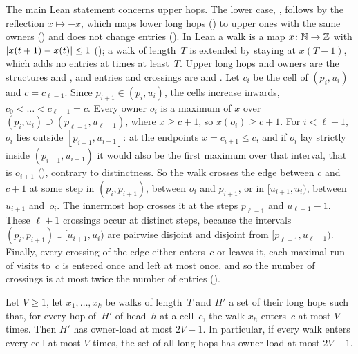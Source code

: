 \begin{outline}
The main Lean statement concerns upper hops. The lower case, , follows by the reflection
$x\mapsto-x$, which maps lower long hops () to upper ones with the same owners () and
does not change entries (). In Lean a walk is a map $x\colon\mathbb{N}\to\mathbb{Z}$ with
$\lvert x(t+1)-x(t) \rvert\le1$ (); a walk of length~$T$ is extended by staying at $x(T-1)$, which adds no entries
at times at least~$T$. Upper long hops and owners are the structures
 and , and entries and crossings are  and . Let $c_i$ be the
cell of $(p_i,u_i)$ and $c=c_{\ell-1}$. Since $p_{i+1}\in(p_i,u_i)$, the cells increase inwards, $c_0<\dots<c_{\ell-1}=c$.
Every owner $o_i$ is a maximum of $x$ over $(p_i,u_i)\supseteq(p_{\ell-1},u_{\ell-1})$, where $x\ge c+1$, so
$x(o_i)\ge c+1$. For $i<\ell-1$, $o_i$ lies outside $[p_{i+1},u_{i+1}]$: at the endpoints $x=c_{i+1}\le c$, and if $o_i$
lay strictly inside $(p_{i+1},u_{i+1})$ it would also be the first maximum over that interval, that is $o_{i+1}$
(), contrary to distinctness. So the walk crosses the edge between $c$ and $c+1$ at some step in
$(p_i,p_{i+1})$, between $o_i$ and $p_{i+1}$, or in $[u_{i+1},u_i)$, between $u_{i+1}$ and~$o_i$. The innermost hop
crosses it at the steps $p_{\ell-1}$ and $u_{\ell-1}-1$. These $\ell+1$ crossings occur at distinct steps, because the
intervals $(p_i,p_{i+1})\cup[u_{i+1},u_i)$ are pairwise disjoint and disjoint from $[p_{\ell-1},u_{\ell-1})$. Finally,
every crossing of the edge either enters~$c$ or leaves it, each maximal run of visits to~$c$ is entered once and left at
most once, and so the number of crossings is at most twice the number of entries ().
\end{outline}

\begin{corollary}\label{cor:owner-load}
Let $V\ge1$, let $x_1,\dots,x_k$ be walks of length~$T$ and $H'$ a set of their long hops such that, for every hop of~$H'$
of head~$h$ at a cell~$c$, the walk $x_h$ enters~$c$ at most $V$ times. Then $H'$ has owner-load at most $2V-1$. In particular, if every
walk enters every cell at most $V$ times, the set of all long hops has owner-load at most $2V-1$.
\end{corollary}

